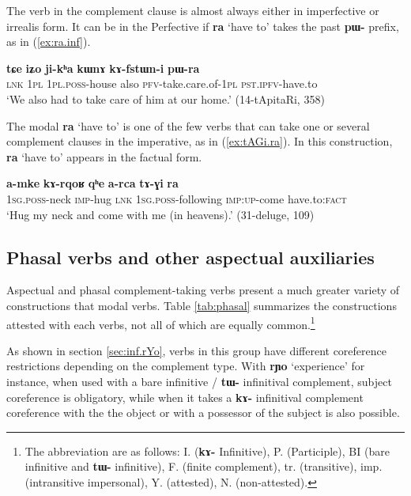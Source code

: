 \documentclass[oneside,a4paper,11pt]{article}
\newcommand{\ipa}[1]{\textbf{\phon#1}} %
\newcommand{\jpg}[2]{\ipa{#1} `#2'} %
\newcommand{\refb}[1]{(\ref{#1})}
\begin{document}
The verb in the complement clause is almost always either in imperfective or irrealis form. It can be in the Perfective if \jpg{ra}{have to} takes the past \ipa{pɯ-} prefix, as in (\ref{ex:ra.inf}).

 \begin{exe}
\ex \label{ex:kAfstWni}
\gll 
\ipa{tɕe} 	\ipa{iʑo} 	\ipa{ji-kʰa} 	\ipa{kɯnɤ} 	\ipa{kɤ-fstɯn-i} 	\ipa{pɯ-ra} \\
\textsc{lnk} \textsc{1pl} \textsc{1pl.poss}-house also \textsc{pfv}-take.care.of-\textsc{1pl} \textsc{pst.ipfv}-have.to \\
\glt `We also had to take care of him at our home.' (14-tApitaRi, 358)
\end{exe}  

The modal \jpg{ra}{have to}  is one of the few verbs that can take one or several complement clauses in the imperative, as in \refb{ex:tAGi.ra}. In this construction, \jpg{ra}{have to} appears in the factual form.

\begin{exe}
\ex \label{ex:tAGi.ra}
\gll \ipa{a-mke} 	\ipa{kɤ-rqoʁ} 	\ipa{qʰe} 	\ipa{a-rca} 	\ipa{tɤ-ɣi} 	\ipa{ra}  \\
\textsc{1sg.poss}-neck \textsc{imp}-hug \textsc{lnk} \textsc{1sg.poss}-following \textsc{imp:up}-come have.to:\textsc{fact} \\
\glt `Hug my neck and come with me (in heavens).' (31-deluge, 109)
\end{exe}

  \subsection{Phasal verbs and other aspectual auxiliaries}
Aspectual and phasal complement-taking verbs present a  much greater variety of constructions that modal verbs. Table \ref{tab:phasal} summarizes the constructions attested with each verbs, not all of which are equally common.\footnote{The abbreviation are as follows: 	I. (\ipa{kɤ-} Infinitive), P.  (Participle), 	BI (bare infinitive and \ipa{tɯ-} infinitive), 	F. (finite complement), tr. (transitive), imp. (intransitive impersonal), Y. (attested), N. (non-attested).  }  

As shown in section \ref{sec:inf.rYo}, verbs in this group have different coreference restrictions depending on the complement type. With  \jpg{rɲo}{experience} for instance, when used with a bare infinitive / \ipa{tɯ-} infinitival complement, subject coreference is obligatory, while when it takes a \ipa{kɤ-} infinitival complement coreference with the the object or with a possessor of the subject is also possible.
\end{document}
